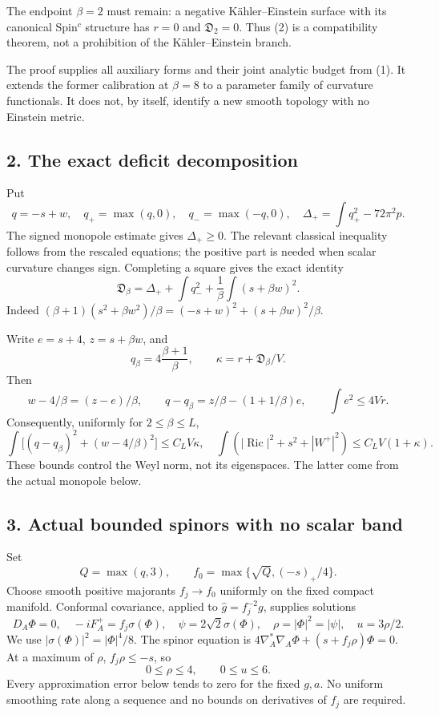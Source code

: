\documentclass[
  11pt,
]{article}
\begin{document}
The endpoint \(\beta=2\) must remain: a negative Kähler--Einstein
surface with its canonical Spin\(^c\) structure has \(r=0\) and
\(\mathfrak D_2=0\). Thus (2) is a compatibility theorem, not a
prohibition of the Kähler--Einstein branch.

The proof supplies all auxiliary forms and their joint analytic budget
from (1). It extends the former calibration at \(\beta=8\) to a
parameter family of curvature functionals. It does not, by itself,
identify a new smooth topology with no Einstein metric.

\hypertarget{the-exact-deficit-decomposition}{%
\subsection{2. The exact deficit
decomposition}\label{the-exact-deficit-decomposition}}

Put \[
q=-s+w,\quad q_+=\max(q,0),\quad q_-=\max(-q,0),\quad
\Delta_+=\int q_+^2-72\pi^2p.
\] The signed monopole estimate gives \(\Delta_+\ge0\). The relevant
classical inequality follows from the rescaled equations; the positive
part is needed when scalar curvature changes sign. Completing a square
gives the exact identity \[
\boxed{
\mathfrak D_\beta
=\Delta_++\int q_-^2+\frac1\beta\int(s+\beta w)^2.
}
\tag{5}
\] Indeed
\((\beta+1)(s^2+\beta w^2)/\beta =(-s+w)^2+(s+\beta w)^2/\beta\).

Write \(e=s+4\), \(z=s+\beta w\), and \[
q_\beta=4\frac{\beta+1}{\beta},\qquad
\kappa=r+\mathfrak D_\beta/V.
\] Then \[
w-4/\beta=(z-e)/\beta,\qquad
q-q_\beta=z/\beta-(1+1/\beta)e,\qquad
\int e^2\le4Vr.
\tag{6}
\] Consequently, uniformly for \(2\le\beta\le L\), \[
\int\bigl[(q-q_\beta)^2+(w-4/\beta)^2\bigr]
\le C_L V\kappa,
\quad
\int(|\operatorname{Ric}|^2+s^2+|W^+|^2)
\le C_L V(1+\kappa).
\tag{7}
\] These bounds control the Weyl norm, not its eigenspaces. The latter
come from the actual monopole below.

\hypertarget{actual-bounded-spinors-with-no-scalar-band}{%
\subsection{3. Actual bounded spinors with no scalar
band}\label{actual-bounded-spinors-with-no-scalar-band}}

Set \[
Q=\max(q,3),\qquad
f_0=\max\{\sqrt Q,(-s)_+/4\}.
\] Choose smooth positive majorants \(f_j\to f_0\) uniformly on the
fixed compact manifold. Conformal covariance, applied to
\(\widehat g=f_j^{-2}g\), supplies solutions \[
D_A\Phi=0,\quad -iF_A^+=f_j\sigma(\Phi),\quad
\psi=2\sqrt2\sigma(\Phi),\quad
\rho=|\Phi|^2=|\psi|,\quad u=3\rho/2.
\tag{8}
\] We use \(|\sigma(\Phi)|^2=|\Phi|^4/8\). The spinor equation is
\(4\nabla_A^*\nabla_A\Phi+(s+f_j\rho)\Phi=0\). At a maximum of \(\rho\),
\(f_j\rho\le-s\), so \[
0\le\rho\le4,\qquad 0\le u\le6.
\tag{9}
\] Every approximation error below tends to zero for the fixed \(g,a\).
No uniform smoothing rate along a sequence and no bounds on derivatives
of \(f_j\) are required.
\end{document}
